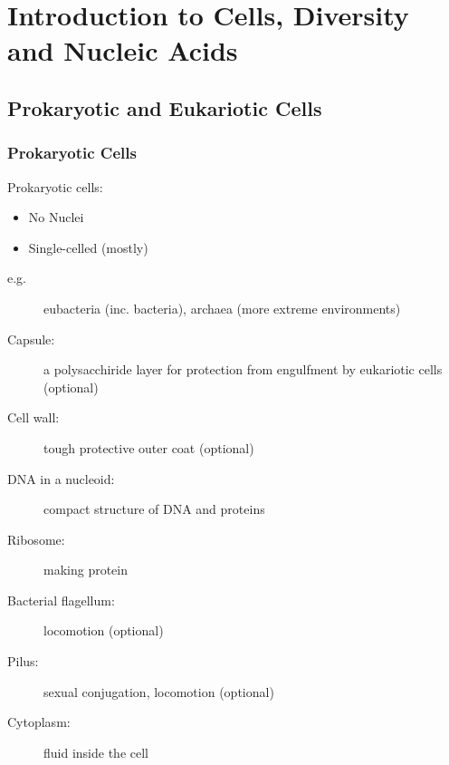 \documentclass[11pt]{scrartcl}
\begin{document}

\section{Introduction to Cells, Diversity and Nucleic Acids}
\label{sec:intro}

\subsection{Prokaryotic and Eukariotic Cells}
\label{subsec:preu}
\subsubsection{Prokaryotic Cells}
\begin{definition*}
  Prokaryotic cells:
  \begin{itemize}
  \item No Nuclei
  \item Single-celled (mostly)
  \end{itemize}
\end{definition*}
\begin{description}

\item[e.g.] eubacteria (inc. bacteria), archaea (more extreme environments)

\end{description}

\begin{description}

\item[Capsule:]  a polysacchiride layer for protection from engulfment by
  eukariotic cells (optional)

\item[Cell wall:] tough protective outer coat (optional)

\item[DNA in a nucleoid:] compact structure of DNA and proteins

\item[Ribosome:]  making protein

\item[Bacterial flagellum:] locomotion (optional)

\item[Pilus:] sexual conjugation, locomotion (optional)

\item[Cytoplasm:] fluid inside the cell

\end{description}
\end{document}
